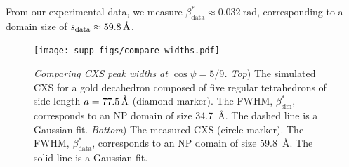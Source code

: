 \documentclass [12pt,fleqn]{article}
\newcommand{\angstrom}{\textup{\AA}}
\begin{document}
From our experimental data, we measure $\beta^*_{\text{data}} \approx \SI{0.032}{\radian}$, corresponding to a domain size of $s_{\text{data}} \approx \SI{59.8}{\angstrom}$.

\begin{figure}[H]
\texttt{[image: supp\_figs/compare\_widths.pdf]}
\caption{\emph{Comparing CXS peak widths at $\cos \psi = 5/9$. Top}) The simulated CXS for a gold decahedron composed of five regular tetrahedrons of side length $a= \SI{77.5}{\angstrom}$ (diamond marker). The FWHM, $\beta^*_{\text{sim}}$, corresponds to an NP domain of size \SI{34.7}{\angstrom}. The dashed line is a Gaussian fit. \emph{Bottom}) The measured CXS (circle marker). The FWHM, $\beta^*_{\text{data}}$, corresponds to an NP domain of size \SI{59.8}{\angstrom}. The solid line is a Gaussian fit.}
\label{compare_widths}
\end{figure}
\end{document}
